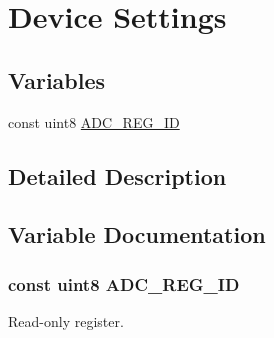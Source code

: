 \hypertarget{group___dev_set}{\section{Device Settings}
\label{group___dev_set}
}
\subsection*{Variables}
\begin{DoxyCompactItemize}
\item 
const uint8 \hyperlink{group___dev_set_gacb9707ddf50de36981ea453deca58b16}{A\-D\-C\-\_\-\-R\-E\-G\-\_\-\-I\-D}
\end{DoxyCompactItemize}


\subsection{Detailed Description}


\subsection{Variable Documentation}
\hypertarget{group___dev_set_gacb9707ddf50de36981ea453deca58b16}{
\subsubsection[{A\-D\-C\-\_\-\-R\-E\-G\-\_\-\-I\-D}]{\setlength{\rightskip}{0pt plus 5cm}const uint8 A\-D\-C\-\_\-\-R\-E\-G\-\_\-\-I\-D}}\label{group___dev_set_gacb9707ddf50de36981ea453deca58b16}
Read-\/only register. 